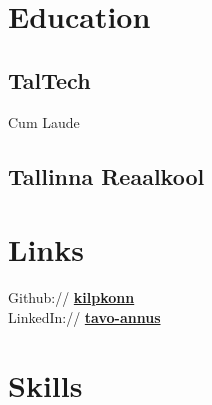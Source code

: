 \documentclass[letterpaper]{deedy-resume} %
\begin{document}
\begin{minipage}[t]{0.33\textwidth} %


\section{Education} 

\subsection{TalTech}


\sectionspace %

Cum Laude \\

\sectionspace %

\subsection{Tallinna Reaalkool}


\sectionspace %


\section{Links} 

Github:// \href{https://github.com/kilpkonn}{\bf kilpkonn} \\
LinkedIn:// \href{https://www.linkedin.com/in/tavo-annus-4a5631171/}{\bf tavo-annus} \\

\sectionspace %


\section{Skills}


\end{minipage}
\end{document}
